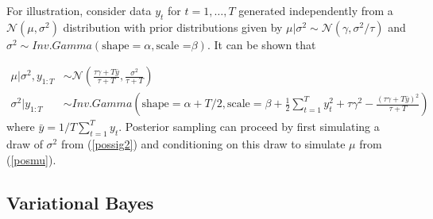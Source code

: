 \documentclass[12pt,a4paper]{article}%
\numberwithin{equation}{section}
\begin{document}
For illustration, consider data $y_t$ for $t = 1, \dots, T$ generated independently from a $\mathcal{N}(\mu, \sigma^2)$ distribution with prior distributions given by $\mu | \sigma^2 \sim \mathcal{N}(\gamma, \sigma^2/\tau)$ and $\sigma^2 \sim Inv.Gamma(\mbox{shape} = \alpha, \mbox{scale =}\beta)$. It can be shown that

\begin{align}
\mu | \sigma^2, y_{1:T} &\sim \mathcal{N} \left(\frac{\tau\gamma + T\bar{y}}{\tau + T}, \frac{\sigma^2}{\tau  + T} \right) \label{posmu} \\
\sigma^2 | y_{1:T} &\sim Inv.Gamma  \left( \mbox{shape} = \alpha + T/2, \mbox{scale} = \beta + \frac{1}{2}\sum_{t=1}^{T}y_t^2 + \tau\gamma^2 - \frac{(\tau\gamma + T\bar{y})^2}{\tau + T} \right) \label{possig2} 
\end{align}
where $\bar{y} = 1/T \sum_{t=1}^{T}y_t$. Posterior sampling can proceed by first simulating a draw of $\sigma^2$ from (\ref{possig2}) and conditioning on this draw to simulate $\mu$ from (\ref{posmu}).

\subsection{Variational Bayes} \label{sec:VB}
\end{document}
